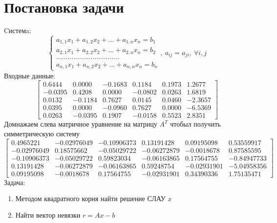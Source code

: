 \documentclass[11.4pt]{article}
\begin{document}
\section{Постановка задачи}
	Cистемa:
	\begin{equation}
		\left\{
			\begin{array}{c}
				a_{1,1} x_1 + a_{1,2} x_2 + \ldots + a_{1,n} x_n = b_1  \\
				a_{2,1} x_1 + a_{2,2} x_2 + \ldots + a_{2,n} x_n = b_2  \\
				\dots\dots\dots\dots\dots\dots\dots\dots\dots\dots\dots  \\
				a_{n,1} x_1 + a_{n,2} x_2 + \ldots + a_{n,n} x_n = b_n  
			\end{array}
		\right.
		, \:a_{ij} = a_{ji}, \: \forall i,j
	\end{equation}
	Входные данные:
	\[
		\left[
			\begin{array}{ccccc|c}
				0.6444 & 0.0000 & -0.1683 & 0.1184 & 0.1973 & 1.2677\\
				-0.0395 & 0.4208 & 0.0000 & -0.0802 & 0.0263 & 1.6819\\
				0.0132  & -0.1184 & 0.7627 & 0.0145 & 0.0460 & -2.3657\\
				0.0395 & 0.0000 & -0.0960 & 0.7627 & 0.0000 & -6.5369\\
				0.0263 & -0.0395 & 0.1907 & -0.0158 & 0.5523 & 2.8351
			\end{array}
		\right]
	\]
	Домнажаем слева матричное уравнение на матрицу $A^T$ чтобыл получить симметрическую систему
	\[
	\left[
			\begin{array}{ccccc|c}
				 0.4965221 & -0.02976049 & -0.10906373 &  0.13191428 & 0.09195098 & 0.53559917\\
 				-0.02976049 & 0.18575662 & -0.05029722 & -0.06272879 & -0.0018678 & 0.87585595\\
 				-0.10906373 & -0.05029722 & 0.59823034 & -0.06163865 &  0.17564755 & -0.84947733\\
 				 0.13191428 & -0.06272879 & -0.06163865 &  0.59248754 & -0.02931901 & -5.04958356\\
 				 0.09195098 & -0.0018678  & 0.17564755 & -0.02931901 &  0.34390336 & 1.75135471
			\end{array}
		\right]
	\]
	Задача:
	\begin{enumerate}
		\item Методом квадратного корня найти решение СЛАУ $x$
		\item Найти вектор невязки $r = Ax-b$
	\end{enumerate}
\end{document}
